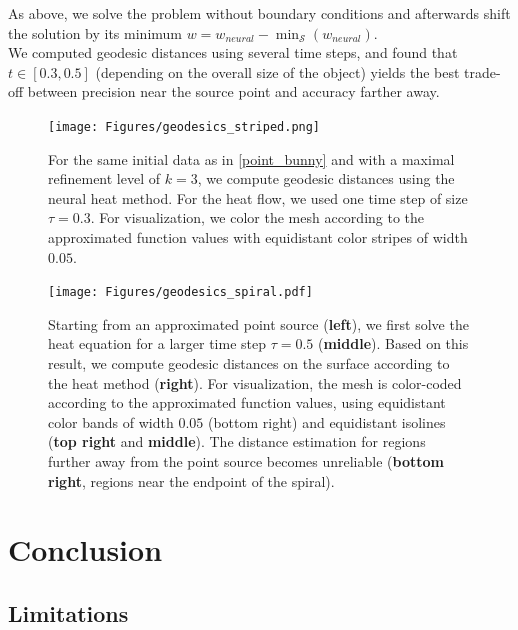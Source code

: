 \documentclass[draft,12pt,openany]{book}
\def\S{\mathcal{S}}
\theoremstyle{plainnormal}
\theoremstyle{remark}
\begin{document}
As above, we solve the problem without boundary conditions and afterwards shift the solution by its minimum $w = w_{neural} - \min_\S(w_{neural}).$\\
We computed geodesic distances using several time steps, and found that \( t \in [0.3, 0.5] \) (depending on the overall size of the object) yields the best trade-off between precision near the source point and accuracy farther away.
\begin{figure}[b]
  \centering
  \begin{minipage}{0.54\linewidth}
    \texttt{[image: Figures/geodesics\_striped.png]}
  \end{minipage}%
  \hspace{0.02\linewidth}
  \begin{minipage}{0.45\linewidth}
    \caption{
      For the same initial data as in \cref{point_bunny} and with a maximal refinement level of $k=3$, we compute geodesic distances using the neural heat method. For the heat flow, we used one time step of size $\tau = 0.3$. For visualization, we color the mesh according to the approximated function values with equidistant color stripes of width $0.05$.}
    \label{fig:geodINHeat2}
  \end{minipage}
\end{figure}

\begin{figure}
    \texttt{[image: Figures/geodesics\_spiral.pdf]}
\caption{Starting from an approximated point source (\textbf{left}), we first solve the heat equation for a larger time step $\tau = 0.5$ (\textbf{middle}). Based on this result, we compute geodesic distances on the surface according to the heat method (\textbf{right}). For visualization, the mesh is color-coded according to the approximated function values, using equidistant color bands of width $0.05$ (bottom right) and equidistant isolines (\textbf{top right} and \textbf{middle}). The distance estimation for regions further away from the point source becomes unreliable (\textbf{bottom right}, regions near the endpoint of the spiral).}\label{}
\end{figure}

\clearpage
\chapter{Conclusion}
\begingroup
\let\clearpage\relax
\section{Limitations}
\end{document}
